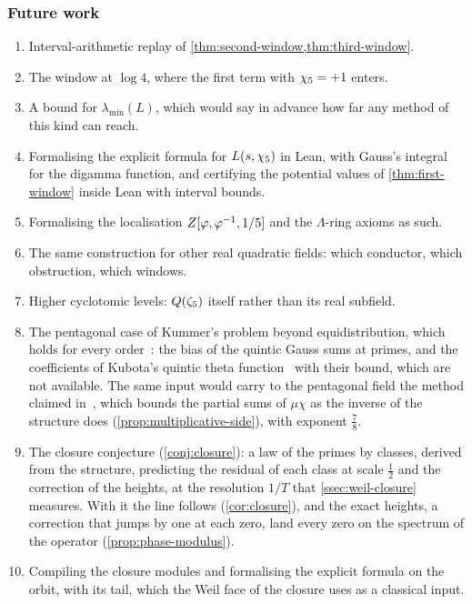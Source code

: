 \subsubsection{Future work}\label{ssec:future}

\begin{enumerate}
  \item Interval-arithmetic replay of \cref{thm:second-window,thm:third-window}.
  \item The window at $\log4$, where the first term with $\chi_5=+1$ enters.
  \item A bound for $\lambda_{\min}(L)$, which would say in advance how far any
    method of this kind can reach.
  \item Formalising the explicit formula for $L(s,\chi_5)$ in Lean, with Gauss's integral
    for the digamma function, and certifying the potential values of
    \cref{thm:first-window} inside Lean with interval bounds.
  \item Formalising the localisation $Z[\varphi,\varphi^{-1},1/5]$ and the $\Lambda$-ring axioms as
    such.
  \item The same construction for other real quadratic fields: which conductor,
    which obstruction, which windows.
  \item Higher cyclotomic levels: $Q(\zeta_5)$ itself rather than its real
    subfield.
  \item The pentagonal case of Kummer's problem beyond equidistribution, which holds for every order~\cite{patterson87}: the bias of the quintic Gauss sums at primes, and the coefficients of Kubota's quintic theta function~\cite{kubota69} with their bound, which are not available.  The same input would carry to the pentagonal field the method claimed
    in~\cite{openai26}, which bounds the partial sums of $\mu\chi$ as the inverse of the structure
    does (\cref{prop:multiplicative-side}), with exponent $\tfrac78$.
  \item The closure conjecture (\cref{conj:closure}): a law of the primes by classes, derived from
    the structure, predicting the residual of each class at scale $\tfrac12$ and the correction
    of the heights, at the resolution $1/T$ that \cref{ssec:weil-closure} measures.  With it the line follows (\cref{cor:closure}), and the exact heights, a correction that jumps
    by one at each zero, land every zero on the spectrum of the operator (\cref{prop:phase-modulus}).
  \item Compiling the closure modules and formalising the explicit formula on the orbit, with
    its tail, which the Weil face of the closure uses as a classical input.

\end{enumerate}
